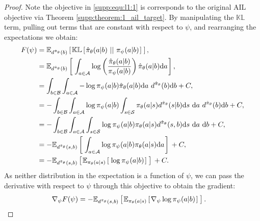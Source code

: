 \begin{proof}
Note the objective in \eqref{supp:equ:l1:1} is corresponds to the original AIL objective via Theorem \ref{supp:theorem:1_ail_target}.  By manipulating the $\mathbb{KL}$ term, pulling out terms that are constant with respect to $\psi$, and rearranging the expectations we obtain:
\begin{align}
    F(\psi) &= \mathbb{E}_{d^{\hat{\pi}_{\theta}}(b)} \lspsqb{}  \mathbb{KL} \lspsqb{}  {\hat{\pi}_{\theta}}(a|b) \klbars{}  \pi_{\psi}(a|b) \rspsqb{}  \rspsqb{} , \\
    &= \mathbb{E}_{d^{\hat{\pi}_{\theta}}(b)} \lspsqb{}  \int_{a \in \mathcal{A}} \log \left(\frac{{\hat{\pi}_{\theta}}(a|b)}{{\pi_{\psi}}(a|b)}\right) {\hat{\pi}_{\theta}}(a|b) \d a \rspsqb{} , \\
    &= \int_{b \in \mathcal{B}} \int_{a \in \mathcal{A}} - \log {\pi_{\psi}}(a|b) {\hat{\pi}_{\theta}}(a|b) \d a \ d^{\hat{\pi}_{\theta}}(b) \d b + C,\\
    &= - \int_{b \in \mathcal{B}} \int_{a \in \mathcal{A}} \log {\pi_{\psi}}(a|b) \int_{s \in \mathcal{S}} \pi_{\theta}(a | s) d^{\hat{\pi}_{\theta}}(s | b) \d s \ \d a \ d^{\hat{\pi}_{\theta}}(b) \d b + C,\\
    &= - \int_{b \in \mathcal{B}} \int_{a \in \mathcal{A}}  \int_{s \in \mathcal{S}} \log {\pi_{\psi}}(a|b)\pi_{\theta}(a | s) d^{\hat{\pi}_{\theta}}(s , b) \d s \ \d a \ \d b + C,\\
    &= - \mathbb{E}_{d^{\hat{\pi}_{\theta}}(s, b)} \lspsqb{}  \int_{a \in \mathcal{A}} \log \pi_{\psi} (a | b) \pi_{\theta}(a | s) \d a \rspsqb{}  + C,  \\
    &= - \mathbb{E}_{d^{\hat{\pi}_{\theta}}(s, b)} \lspsqb{}  \mathbb{E}_{\pi_{\theta}(a | s)} \lspsqb{}  \log \pi_{\psi} (a | b) \rspsqb{}  \rspsqb{}  + C . \label{OLD:supp:equ:a2d:expectation}
\end{align}
As neither distribution in the expectation is a function of $\psi$, we can pass the derivative with respect to $\psi$ through this objective to obtain the gradient:
\begin{align}
    \nabla_{\psi} F (\psi) &= - \mathbb{E}_{d^{\hat{\pi}_{\theta}}(s, b)} \left[ \hspace*{0.1em}{}  \mathbb{E}_{\pi_{\theta}(a | s)} \left[ \hspace*{0.1em}{}  \nabla_{\psi} \log \pi_{\psi} (a | b) \hspace*{0.1em} \right]{}  \hspace*{0.1em} \right]{} . \label{supp:equ:l1:grad}
\end{align}
\end{proof}
